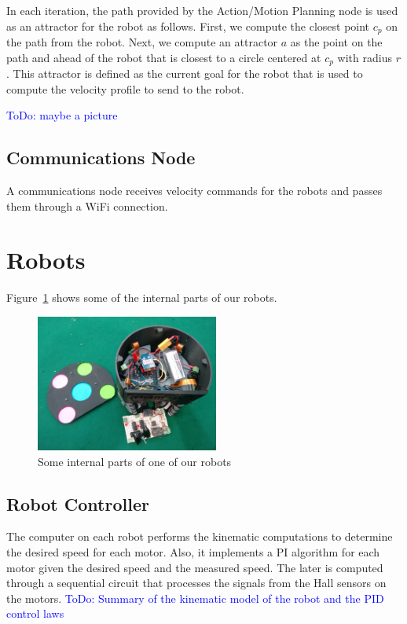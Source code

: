 \documentclass[]{llncs}
\newcommand{\TODO}[1]{{\textcolor{blue}{ToDo: {#1}}}}
\begin{document}
In each iteration, the path provided by the Action/Motion Planning node is used as an attractor for the robot as follows. First, we compute the closest point $c_p$ on the path from the robot. Next, we compute an attractor $a$ as the point on the path and ahead of the robot that is closest to a circle centered at $c_p$ with radius $r$. This attractor is defined as the current goal for the robot that is used to compute the velocity profile to send to the robot.

\TODO{maybe a picture}

\subsection{Communications Node}
A communications node receives velocity commands for the robots and passes them through a WiFi connection.




\section{Robots}

Figure~\ref{fig:one_ekbot_inside} shows some of the internal parts of our robots.

\begin{figure}[htb]
	\centering
	\includegraphics[width=6cm]{./pictures/one_ekbot_inside.jpg}
	\caption{Some internal parts of one of our robots}
	\label{fig:one_ekbot_inside}  
\end{figure}


\subsection{Robot Controller}
The computer on each robot performs the kinematic computations to
determine the desired speed for each motor. Also, it implements a PI
algorithm for each motor given the desired speed and the measured
speed. The later is computed through a sequential circuit that processes
the signals from the Hall sensors on the motors. 
\TODO{Summary of the kinematic model of the robot and the PID control laws} 
\end{document}
